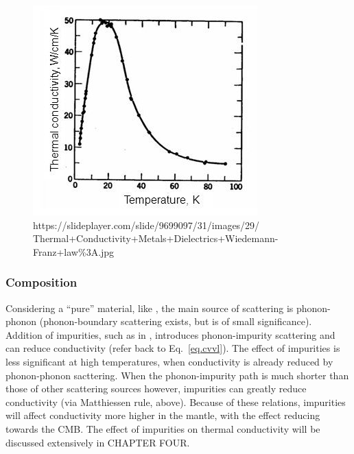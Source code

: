 \begin{figure}[h!]
  \includegraphics[width=\linewidth]{Figures/kappa-temp-dep.png}
  \caption[KAPPA AGAINST TEMP]{https://slideplayer.com/slide/9699097/31/images/29/
  Thermal+Conductivity+Metals+Dielectrics+Wiedemann-Franz+law\%3A.jpg}
  \label{fig:kappa-temp-dep}
\end{figure}


\subsubsection{Composition}

Considering a ``pure'' material, like \mgsios \bdg, the main source of scattering is phonon-phonon (phonon-boundary scattering exists, but is of small significance). Addition of impurities, such as in \mgfesios \pv, introduces phonon-impurity scattering and can reduce conductivity (refer back to Eq.~\ref{eq.cvvl}). The effect of impurities is less significant at high temperatures, when conductivity is already reduced by phonon-phonon sacttering. When the phonon-impurity path is much shorter than those of other scattering sources however, impurities can greatly reduce conductivity (via Matthiessen rule, above). Because of these relations, impurities will affect conductivity more higher in the mantle, with the effect reducing towards the CMB. The effect of impurities on thermal conductivity will be discussed extensively in CHAPTER FOUR.





